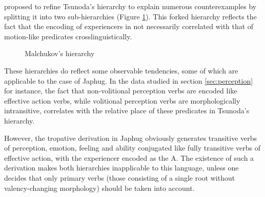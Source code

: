 \documentclass[oldfontcommands,oneside,a4paper,11pt]{article}
\begin{document}
\citet{malchukov05competition} proposed to refine Tsunoda's hierarchy to explain numerous counterexamples by splitting it into two sub-hierarchies (Figure \ref{fig:malchukov}). This forked hierarchy reflects the fact that the encoding of experiencers in not necessarily correlated with that of motion-like predicates crosslinguistically.
 
 \begin{figure}[H]
\caption{Malchukov's hierarchy} \label{fig:malchukov}

\end{figure}
 These hierarchies do reflect some observable tendencies, some of which are applicable to the case of Japhug. In the data studied in section \ref{sec:perception} for instance, the fact that non-volitional perception verbs are encoded like effective action verbs, while volitional perception verbs are morphologically intransitive, correlates with the relative place of these predicates in Tsunoda's hierarchy.
 
However,  the tropative derivation in Japhug obviously generates transitive verbs of perception, emotion, feeling and  ability conjugated like fully transitive verbs of effective action, with the experiencer encoded as the A. The existence of such a derivation makes both hierarchies inapplicable to this language, unless one decides that only primary verbs (those consisting of a single root without valency-changing morphology) should be taken into account.
\end{document}
